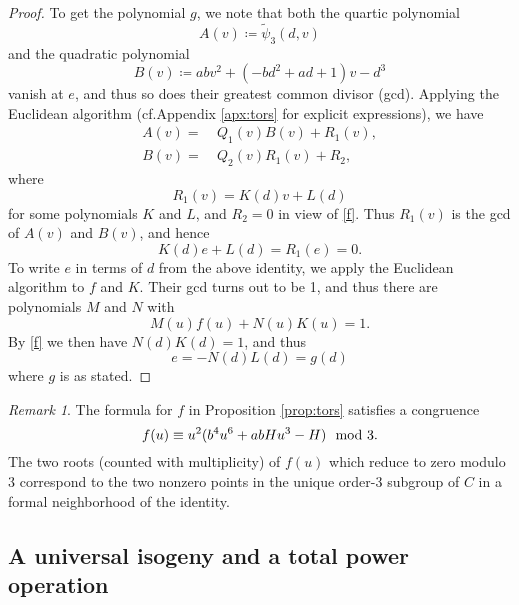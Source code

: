 \documentclass{gtpart}
\theoremstyle{definition}
\theoremstyle{remark}
\newtheorem{rmk}[thm]{Remark}
\newcommand{\cf}{cf.\thinspace}
\newcommand{\Tp}{\widetilde{\psi}}
\newcommand{\md}{~~{\rm mod}~}
\begin{document}
\begin{proof}
 To get the polynomial $g$, we note that both the quartic polynomial 
 \[
  A(v) \coloneqq \Tp_3(d,v) 
 \]
 and the quadratic polynomial 
 \[
  B(v) \coloneqq a b v^2 + (-b d^2 + a d + 1) v - d^3 
 \]
 vanish at $e$, and thus so does their greatest common divisor (gcd).  
 Applying the Euclidean algorithm (\cf Appendix \ref{apx:tors} for explicit expressions), we have 
 \begin{equation*}
 \begin{split}
  A(v) = & ~ Q_1(v) B(v) + R_1(v), \\
  B(v) = & ~ Q_2(v) R_1(v) + R_2, 
 \end{split}
 \end{equation*}
 where 
 \[
  R_1(v) = K(d) v + L(d) 
 \]
 for some polynomials $K$ and $L$, and $R_2 = 0$ in view of \eqref{f}.  Thus $R_1(v)$ is the gcd of $A(v)$ and $B(v)$, and hence 
 \[
  K(d) e + L(d) = R_1(e) = 0.  
 \]
 To write $e$ in terms of $d$ from the above identity, we apply the Euclidean algorithm to $f$ and $K$.  
 Their gcd turns out to be 1, and thus there are polynomials $M$ and $N$ with 
 \[
  M(u) f(u) + N(u) K(u) = 1.  
 \]
 By \eqref{f} we then have $N(d) K(d) = 1$, and thus 
 \[
  e = -N(d) L(d) = g(d) 
 \]
 where $g$ is as stated.  
\end{proof}

\begin{rmk}
\label{rmk:dmod3}
 The formula for $f$ in Proposition \ref{prop:tors} satisfies a congruence 
 \[
  f(u) \equiv u^2 (b^4 u^6 + a b H u^3 - H) \md 3.  
 \]
 The two roots (counted with multiplicity) of $f(u)$ which reduce to zero modulo 3 correspond to 
 the two nonzero points in the unique order-3 subgroup of $C$ in a formal neighborhood of the identity.  
\end{rmk}


\subsection{A universal isogeny and a total power operation}
\end{document}
